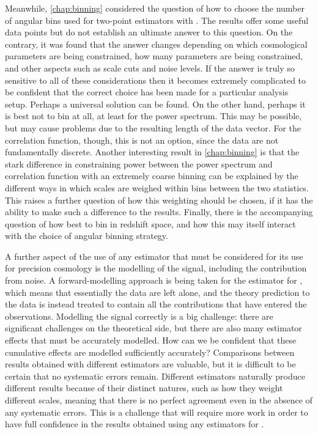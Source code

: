 Meanwhile, \autoref{chap:binning} considered the question of how to choose the number of angular bins used for two-point estimators with \Euclid{}. The results offer some useful data points but do not establish an ultimate answer to this question. On the contrary, it was found that the answer changes depending on which cosmological parameters are being constrained, how many parameters are being constrained, and other aspects such as scale cuts and noise levels. If the answer is truly so sensitive to all of these considerations then it becomes extremely complicated to be confident that the correct choice has been made for a particular analysis setup. Perhaps a universal solution can be found. On the other hand, perhaps it is best not to bin at all, at least for the power spectrum. This may be possible, but may cause problems due to the resulting length of the data vector. For the correlation function, though, this is not an option, since the data are not fundamentally discrete. Another interesting result in \autoref{chap:binning} is that the stark difference in constraining power between the power spectrum and correlation function with an extremely coarse binning can be explained by the different ways in which scales are weighed within bins between the two statistics. This raises a further question of how this weighting should be chosen, if it has the ability to make such a difference to the results. Finally, there is the accompanying question of how best to bin in redshift space, and how this may itself interact with the choice of angular binning strategy.

A further aspect of the use of any estimator that must be considered for its use for precision cosmology is the modelling of the signal, including the contribution from noise. A forward-modelling approach is being taken for the \pcl{} estimator for \Euclid{}, which means that essentially the data are left alone, and the theory prediction to the data is instead treated to contain all the contributions that have entered the observations. Modelling the signal correctly is a big challenge: there are significant challenges on the theoretical side, but there are also many estimator effects that must be accurately modelled. How can we be confident that these cumulative effects are modelled sufficiently accurately? Comparisons between results obtained with different estimators are valuable, but it is difficult to be certain that no systematic errors remain. Different estimators naturally produce different results because of their distinct natures, such as how they weight different scales, meaning that there is no perfect agreement even in the absence of any systematic errors. This is a challenge that will require more work in order to have full confidence in the results obtained using any estimators for \Euclid{}.

